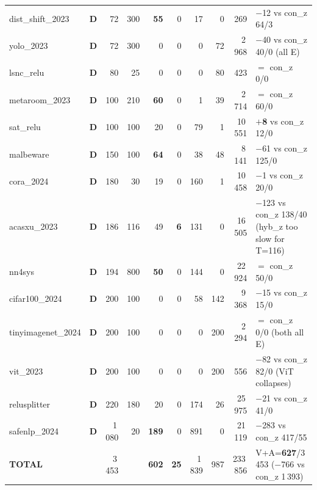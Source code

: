 \documentclass[10pt]{beamer}
\newcommand{\sdone}{{\color{cdone}\textbf{D}}}
\begin{document}
\begin{frame}[fragile]
\begin{tabular}{l c r r r r r r r l}
dist\_shift\_2023                 & \sdone & 72    & 300     & \textbf{55}  & 0           & 17    & 0   & 269     & $-$12 vs con\_z 64/3 \\
yolo\_2023                        & \sdone & 72    & 300     & 0            & 0           & 0     & 72  & 2\,968  & $-$40 vs con\_z 40/0 (all E) \\
lsnc\_relu                        & \sdone & 80    & 25      & 0            & 0           & 0     & 80  & 423     & $=$ con\_z 0/0 \\
metaroom\_2023                    & \sdone & 100   & 210     & \textbf{60}  & 0           & 1     & 39  & 2\,714  & $=$ con\_z 60/0 \\
sat\_relu                         & \sdone & 100   & 100     & 20           & 0           & 79    & 1   & 10\,551 & \textbf{$+$8} vs con\_z 12/0 \\
malbeware                         & \sdone & 150   & 100     & \textbf{64}  & 0           & 38    & 48  & 8\,141  & $-$61 vs con\_z 125/0 \\
cora\_2024                        & \sdone & 180   & 30      & 19           & 0           & 160   & 1   & 10\,458 & $-$1 vs con\_z 20/0 \\
acasxu\_2023                      & \sdone & 186   & 116     & 49           & \textbf{6}  & 131   & 0   & 16\,505 & $-$123 vs con\_z 138/40 (hyb\_z too slow for T=116) \\
nn4sys                            & \sdone & 194   & 800     & \textbf{50}  & 0           & 144   & 0   & 22\,924 & $=$ con\_z 50/0 \\
cifar100\_2024                    & \sdone & 200   & 100     & 0            & 0           & 58    & 142 & 9\,368  & $-$15 vs con\_z 15/0 \\
tinyimagenet\_2024                & \sdone & 200   & 100     & 0            & 0           & 0     & 200 & 2\,294  & $=$ con\_z 0/0 (both all E) \\
vit\_2023                         & \sdone & 200   & 100     & 0            & 0           & 0     & 200 & 556     & $-$82 vs con\_z 82/0 (ViT collapses) \\
relusplitter                      & \sdone & 220   & 180     & 20           & 0           & 174   & 26  & 25\,975 & $-$21 vs con\_z 41/0 \\
safenlp\_2024                     & \sdone & 1\,080 & 20      & \textbf{189} & 0           & 891   & 0   & 21\,119 & $-$283 vs con\_z 417/55 \\
\midrule
\textbf{TOTAL}                    &        & 3\,453 &        & \textbf{602} & \textbf{25} & 1\,839 & 987 & 233\,856 & V+A=\textbf{627}/3\,453 ($-$766 vs con\_z 1\,393) \\
\bottomrule
\end{tabular}


\end{frame}
\end{document}
